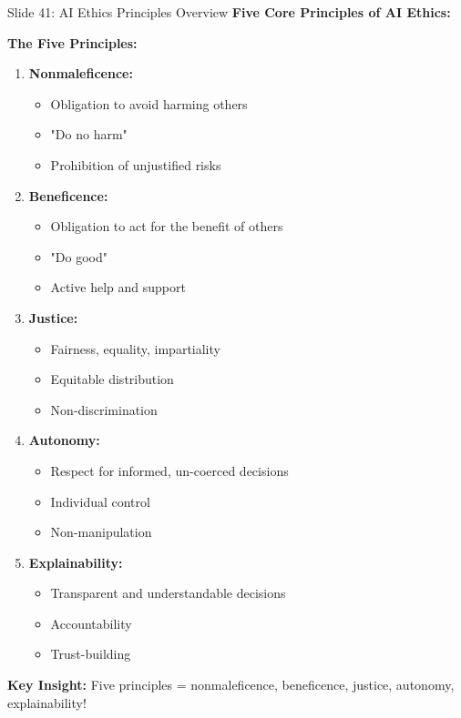 \documentclass[8pt]{beamer}
\begin{document}
	
	\begin{frame}{Slide 41: AI Ethics Principles Overview}
		\fontsize{6.5}{7.5}\selectfont
		\textbf{Five Core Principles of AI Ethics:}
		
		\vspace{0.1cm}
		\textbf{The Five Principles:}
		\begin{enumerate}
			\item \textbf{Nonmaleficence:}
			\begin{itemize}
				\item Obligation to avoid harming others
				\item "Do no harm"
				\item Prohibition of unjustified risks
			\end{itemize}
			\item \textbf{Beneficence:}
			\begin{itemize}
				\item Obligation to act for the benefit of others
				\item "Do good"
				\item Active help and support
			\end{itemize}
			\item \textbf{Justice:}
			\begin{itemize}
				\item Fairness, equality, impartiality
				\item Equitable distribution
				\item Non-discrimination
			\end{itemize}
			\item \textbf{Autonomy:}
			\begin{itemize}
				\item Respect for informed, un-coerced decisions
				\item Individual control
				\item Non-manipulation
			\end{itemize}
			\item \textbf{Explainability:}
			\begin{itemize}
				\item Transparent and understandable decisions
				\item Accountability
				\item Trust-building
			\end{itemize}
		\end{enumerate}
		
		\textcolor{myblue}{\textbf{Key Insight:}} Five principles = \textcolor{myblue}{nonmaleficence, beneficence, justice, autonomy, explainability}!
	\end{frame}
	
\end{document}
